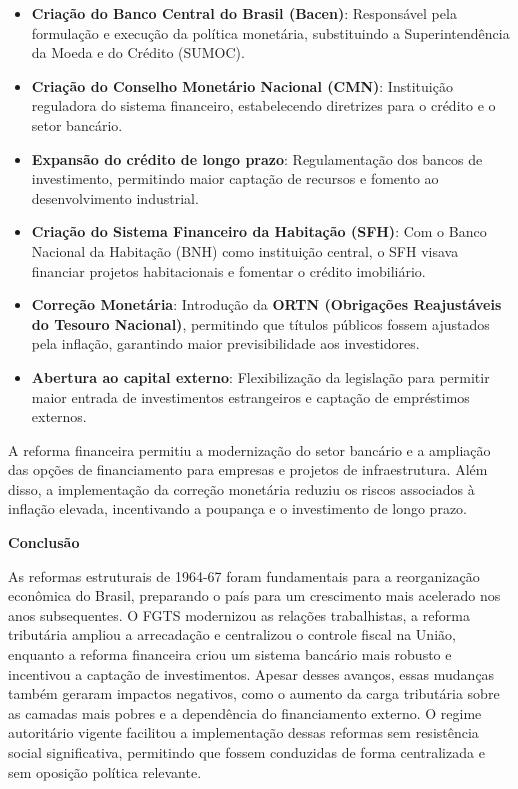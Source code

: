 \documentclass[a4paper,12pt]{article}[abntex2]
\begin{document}
\begin{itemize}
    \item \textbf{Criação do Banco Central do Brasil (Bacen)}: Responsável pela formulação e execução da política monetária, substituindo a Superintendência da Moeda e do Crédito (SUMOC).
    \item \textbf{Criação do Conselho Monetário Nacional (CMN)}: Instituição reguladora do sistema financeiro, estabelecendo diretrizes para o crédito e o setor bancário.
    \item \textbf{Expansão do crédito de longo prazo}: Regulamentação dos bancos de investimento, permitindo maior captação de recursos e fomento ao desenvolvimento industrial.
    \item \textbf{Criação do Sistema Financeiro da Habitação (SFH)}: Com o Banco Nacional da Habitação (BNH) como instituição central, o SFH visava financiar projetos habitacionais e fomentar o crédito imobiliário.
    \item \textbf{Correção Monetária}: Introdução da \textbf{ORTN (Obrigações Reajustáveis do Tesouro Nacional)}, permitindo que títulos públicos fossem ajustados pela inflação, garantindo maior previsibilidade aos investidores.
    \item \textbf{Abertura ao capital externo}: Flexibilização da legislação para permitir maior entrada de investimentos estrangeiros e captação de empréstimos externos.
\end{itemize}

A reforma financeira permitiu a modernização do setor bancário e a ampliação das opções de financiamento para empresas e projetos de infraestrutura. Além disso, a implementação da correção monetária reduziu os riscos associados à inflação elevada, incentivando a poupança e o investimento de longo prazo.

\textbf{Conclusão}

As reformas estruturais de 1964-67 foram fundamentais para a reorganização econômica do Brasil, preparando o país para um crescimento mais acelerado nos anos subsequentes. O FGTS modernizou as relações trabalhistas, a reforma tributária ampliou a arrecadação e centralizou o controle fiscal na União, enquanto a reforma financeira criou um sistema bancário mais robusto e incentivou a captação de investimentos. Apesar desses avanços, essas mudanças também geraram impactos negativos, como o aumento da carga tributária sobre as camadas mais pobres e a dependência do financiamento externo. O regime autoritário vigente facilitou a implementação dessas reformas sem resistência social significativa, permitindo que fossem conduzidas de forma centralizada e sem oposição política relevante.
\end{document}
